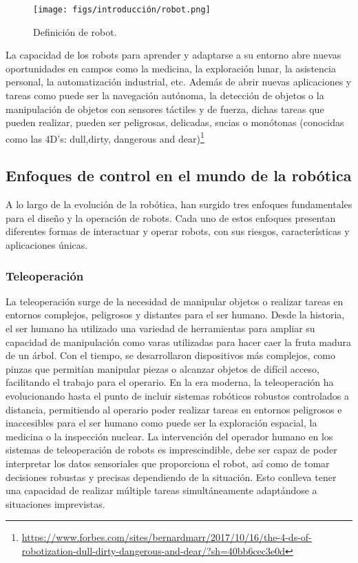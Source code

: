 \begin{figure} [H]
  \begin{center}
    \texttt{[image: figs/introducción/robot.png]}
  \end{center}
  \caption{Definición de robot.}
  \label{fig:robot}
  \vspace{-1.5em}
\end{figure}

La capacidad de los robots para aprender y adaptarse a su entorno abre nuevas oportunidades en campos como la medicina, la exploración lunar, la asistencia personal, la automatización industrial, etc. 
Además de abrir nuevas aplicaciones y tareas como puede ser la navegación autónoma, la detección de objetos o 
la manipulación de objetos con sensores táctiles y de fuerza, dichas tareas que pueden realizar, pueden ser peligrosas, delicadas, sucias o monótonas 
(conocidas como las 4D's: dull,dirty, dangerous and dear)\footnote{\url{https://www.forbes.com/sites/bernardmarr/2017/10/16/the-4-ds-of-robotization-dull-dirty-dangerous-and-dear/?sh=40bb6cec3e0d}}


 \subsection{Enfoques de control en el mundo de la robótica}
 \label{sec:enfoquesrobotica}
A lo largo de la evolución de la robótica, han surgido tres enfoques fundamentales para el diseño y la operación de robots. Cada uno de estos enfoques presentan diferentes
formas de interactuar y operar robots, con sus riesgos, características y aplicaciones únicas. 
\subsubsection{Teleoperación}
\label{sec:subseccion}

La teleoperación surge de la necesidad de manipular objetos o realizar tareas en entornos complejos, peligrosos y distantes para el ser humano. Desde la historia, el ser humano
ha utilizado una variedad de herramientas para ampliar su capacidad de manipulación como varas utilizadas para hacer caer la fruta madura de un árbol. Con el tiempo, se desarrollaron 
dispositivos más complejos, como pinzas que permitían manipular piezas o alcanzar objetos de difícil acceso, facilitando el trabajo para el operario. En la era moderna, la teleoperación
ha evolucionando hasta el punto de incluir sistemas robóticos robustos controlados a distancia, permitiendo al operario poder realizar
tareas en entornos peligrosos e inaccesibles para el ser humano como puede ser la exploración espacial, la medicina o la inspección nuclear.
La intervención del operador humano en los sistemas de teleoperación de robots es imprescindible, debe ser capaz de poder interpretar los datos sensoriales que proporciona el robot, así como de 
tomar decisiones robustas y precisas dependiendo de la situación. Esto conlleva tener una capacidad de realizar múltiple tareas simultáneamente adaptándose a situaciones imprevistas.

